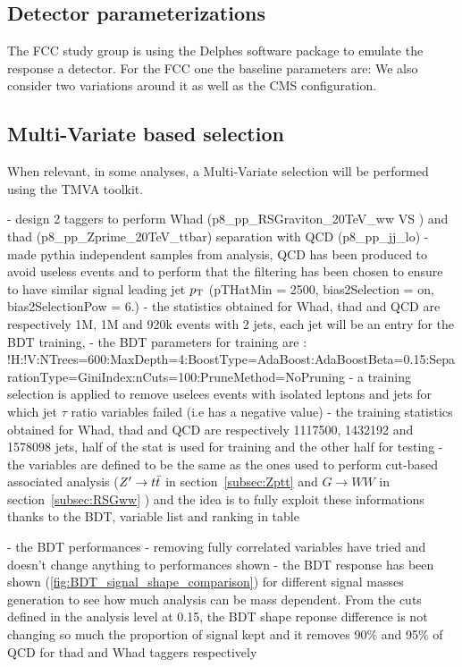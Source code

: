 \documentclass{cernrep}
\begin{document}
\subsection{Detector parameterizations}
The FCC study group is using the Delphes software package to emulate the response a detector. 
For the FCC one the baseline parameters are:
We also consider two variations around it as well as the CMS configuration.


\subsection{Multi-Variate based selection}
When relevant, in some analyses, a Multi-Variate selection will be performed using the TMVA toolkit.

- design 2 taggers to perform Whad (p8\_pp\_RSGraviton\_20TeV\_ww VS ) and thad (p8\_pp\_Zprime\_20TeV\_ttbar) separation with QCD (p8\_pp\_jj\_lo)
- made pythia independent samples from analysis, QCD has been produced to avoid useless events and to perform that the filtering has been chosen to ensure to have similar signal leading jet $p\sb{\scriptstyle\mathrm{T}}$ (pTHatMin = 2500, bias2Selection = on, bias2SelectionPow = 6.)
- the statistics obtained for Whad, thad and QCD are respectively 1M, 1M and 920k events with 2 jets, each jet will be an entry for the BDT training,
- the BDT parameters for training are : !H:!V:NTrees=600:MaxDepth=4:BoostType=AdaBoost:AdaBoostBeta=0.15:SeparationType=GiniIndex:nCuts=100:PruneMethod=NoPruning
- a training selection is applied to remove uselees events with isolated leptons and jets for which jet $\tau$ ratio variables failed (i.e has a negative value)
- the training statistics obtained for Whad, thad and QCD are respectively 1117500, 1432192 and 1578098 jets, half of the stat is used for training and the other half for testing
- the variables are defined to be the same as the ones used to perform cut-based associated analysis ($Z^{\prime} \rightarrow t\bar{t}$ in section~\ref{subsec:Zptt} and $G \rightarrow WW$ in section~\ref{subsec:RSGww} ) and the idea is to fully exploit these informations thanks to the BDT, variable list and ranking in table

- the BDT performances 
- removing fully correlated variables have tried and doesn't change anything to performances shown
- the BDT response has been shown (\ref{fig:BDT_signal_shape_comparison}) for different signal masses generation to see how much analysis can be mass dependent. From the cuts defined in the analysis level at 0.15, the BDT shape reponse difference is not changing so much the proportion of signal kept and it removes 90\% and 95\% of QCD for thad and Whad taggers respectively
\end{document}
